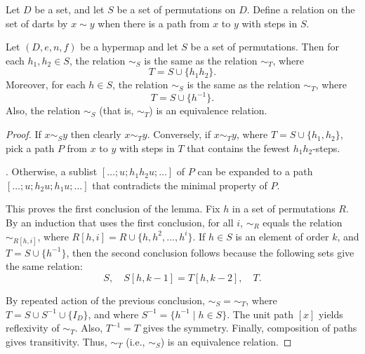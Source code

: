 \begin{definition}[$\sim_S$]
Let $D$ be a set, and let $S$ be a 
set of permutations on $D$.
Define a relation on the set of darts by $x\sim y$ when there is a
path from $x$ to $y$ with steps in $S$.
\end{definition}

\begin{lemma}\guid{}\label{lemma:er} %
Let $(D,e,n,f)$ be a hypermap and let $S$ be a  set of permutations.
Then for each $h_1,h_2\in S$, 
the relation $\sim_S$ is the same as the relation $\sim_T$, where
\begin{displaymath}
T = S \cup \{h_1h_2\}.
\end{displaymath}
Moreover, for each $h\in S$, 
the relation $\sim_S$ is the same as the relation $\sim_T$, where
\begin{displaymath}
T = S \cup \{h^{-1}\}.
\end{displaymath}
Also,  the relation $\sim_S$ (that is, $\sim_T$) is an equivalence relation.  
%
\end{lemma}

\begin{proof} If $x\sim_S y$ then clearly $x\sim_T y$.  Conversely,
if $x\sim_T y$, where $T = S\cup\{h_1,h_2\}$, pick a path $P$ from $x$ to $y$ with steps
in $T$ that contains the fewest $h_1h_2$-steps.  

.  Otherwise, a sublist $[\ldots;u;h_1h_2u;\ldots]$
of $P$ can be expanded to a path $[\ldots;u;h_2u;h_1u;\ldots]$ that contradicts the minimal
property of $P$.

This proves the first conclusion of the lemma.  Fix $h$ in a set of permutations $R$.
By an induction that uses the first conclusion,  for all $i$, $\sim_R$ equals the relation $\sim_{R[h,i]}$,
where $R[h,i] = R \cup \{h,h^2,\ldots,h^i\}$.  If $h\in S$ is an element of order $k$, 
and $T = S\cup\{h^{-1}\}$, then
the second conclusion follows because the following sets give the same relation:
\begin{displaymath}
S,\quad S[h,k-1] = T[h,k-2],\quad T.
\end{displaymath}

By repeated action of the previous conclusion, $\sim_S=\sim_T$, where 
$T = S\cup S^{-1}\cup \{I_D\}$, and where $S^{-1} = \{h^{-1}\mid h\in S\}$.
The unit path $[x]$ yields reflexivity of $\sim_T$.  Also, $T^{-1} = T$ gives the symmetry.  Finally, composition of paths gives transitivity.  Thus, $\sim_T$ (i.e., $\sim_S$) is an equivalence relation.
\end{proof}

